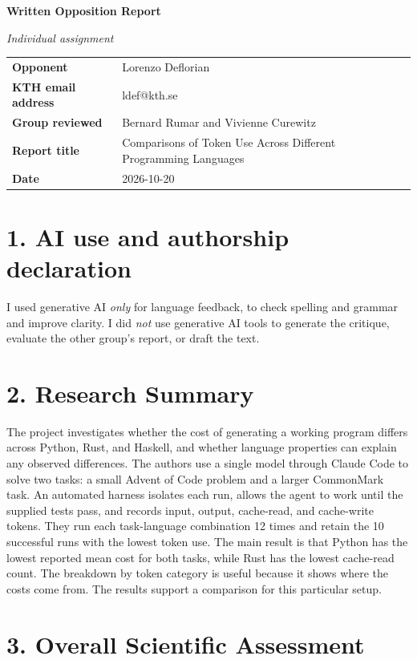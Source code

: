 \documentclass[11pt,a4paper]{extarticle}
\newcommand{\response}[1]{%
  {\color{responsegray}\fontsize{10.5}{11.8}\selectfont #1\par}\vspace{5pt}%
}
\newcommand{\responsebig}[1]{%
  {\color{responsegray}\fontsize{10.5}{11.8}\selectfont #1\par}\vspace{12pt}%
}
\begin{document}
{\bfseries\fontsize{14}{16}\selectfont Written Opposition Report\par}
{\itshape\fontsize{11}{13}\selectfont Individual assignment\par}
\vspace{6pt}

\begin{tabularx}{\textwidth}{>{\bfseries}L{1.25in}Y}
Opponent & Lorenzo Deflorian \\
KTH email address & ldef@kth.se \\
Group reviewed & Bernard Rumar and Vivienne Curewitz \\
Report title & Comparisons of Token Use Across Different Programming Languages \\
Date & 2026-10-20 \\
\end{tabularx}
\vspace{8pt}

\section*{1. AI use and authorship declaration}
\response{I used generative AI \emph{only} for language feedback, to check spelling and grammar and improve clarity. I did \emph{not} use generative AI tools to generate the critique, evaluate the other group’s report, or draft the text.}

\section*{2. Research Summary}
\responsebig{The project investigates whether the cost of generating a working program differs across Python, Rust, and Haskell, and whether language properties can explain any observed differences. The authors use a single model through Claude Code to solve two tasks: a small Advent of Code problem and a larger CommonMark task. An automated harness isolates each run, allows the agent to work until the supplied tests pass, and records input, output, cache-read, and cache-write tokens. They run each task-language combination 12 times and retain the 10 successful runs with the lowest token use. The main result is that Python has the lowest reported mean cost for both tasks, while Rust has the lowest cache-read count. The breakdown by token category is useful because it shows where the costs come from. The results support a comparison for this particular setup.}

\section*{3. Overall Scientific Assessment}
\end{document}
